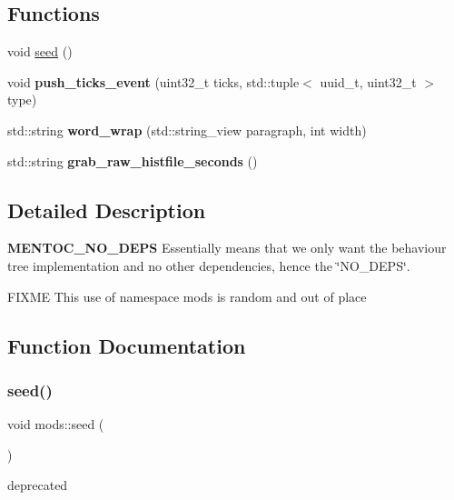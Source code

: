 \subsection*{Functions}
\begin{DoxyCompactItemize}
\item 
void \hyperlink{namespacemods_ac68072b024d7dcb997dfc641bb28b800}{seed} ()
\item 
\mbox{\label{namespacemods_a427873d2048666aaf2f8e8d2faa21a3b}} 
void {\bfseries push\+\_\+ticks\+\_\+event} (uint32\+\_\+t ticks, std\+::tuple$<$ uuid\+\_\+t, uint32\+\_\+t $>$ type)
\item 
\mbox{\label{namespacemods_addf3418f10b7ed3ad99d0010a3c5d9a9}} 
std\+::string {\bfseries word\+\_\+wrap} (std\+::string\+\_\+view paragraph, int width)
\item 
\mbox{\label{namespacemods_a1535bd777bd15b17b9bb8d773f638afd}} 
std\+::string {\bfseries grab\+\_\+raw\+\_\+histfile\+\_\+seconds} ()
\end{DoxyCompactItemize}


\subsection{Detailed Description}
{\bfseries M\+E\+N\+T\+O\+C\+\_\+\+N\+O\+\_\+\+D\+E\+PS} Essentially means that we only want the behaviour tree implementation and no other dependencies, hence the \char`\"{}\+N\+O\+\_\+\+D\+E\+P\+S\char`\"{}.

F\+I\+X\+ME This use of namespace mods is random and out of place 

\subsection{Function Documentation}
\mbox{\label{namespacemods_ac68072b024d7dcb997dfc641bb28b800}} 
\subsubsection{\texorpdfstring{seed()}{seed()}}
{\footnotesize\ttfamily void mods\+::seed (\begin{DoxyParamCaption}{ }\end{DoxyParamCaption})}

deprecated 